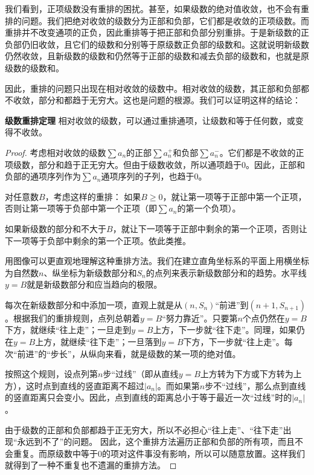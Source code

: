 \documentclass[12pt,UTF8,fontset=none]{ctexbook}
\begin{document}
我们看到，正项级数没有重排的困扰。甚至，如果级数的绝对值收敛，也不会有重排的问题。我们把绝对收敛的级数分为正部和负部，它们都是收敛的正项级数。而重排并不改变通项的正负，因此重排等于把正部和负部分别重排。于是新级数的正负部仍旧收敛，且它们的级数和分别等于原级数正负部的级数和。这就说明新级数仍然收敛，且新级数的级数和仍然等于正部的级数和减去负部的级数和，也就是原级数的级数和。

因此，重排的问题只出现在相对收敛的级数中。相对收敛的级数，其正部和负部都不收敛，部分和都趋于无穷大。这也是问题的根源。我们可以证明这样的结论：
\begin{tm}{\textbf{级数重排定理}}
    相对收敛的级数，可以通过重排通项，让级数和等于任何数，或变得不收敛。
\end{tm}

\begin{proof}
    考虑相对收敛的级数$\sum a_n$的正部$\sum a_n^+$和负部$\sum a_n^-$。它们都是不收敛的正项级数，部分和趋于正无穷大。但由于级数收敛，所以通项趋于$0$。因此，正部和负部的通项序列作为$\sum a_n$通项序列的子列，也趋于$0$。

    对任意数$B$，考虑这样的重排：
    如果$B\geqslant 0$，就让第一项等于正部中第一个正项，否则让第一项等于负部中第一个正项（即$\sum a_n$的第一个负项）。

    如果新级数的部分和不大于$B$，就让下一项等于正部中剩余的第一个正项，否则让下一项等于负部中剩余的第一个正项。依此类推。

    用图像可以更直观地理解这种重排方法。我们在建立直角坐标系的平面上用横坐标为自然数$n$、纵坐标为新级数部分和$S_n$的点列来表示新级数部分和的趋势。水平线$y = B$就是新级数部分和应当趋向的极限。

    每次在新级数部分和中添加一项，直观上就是从$(n, S_n)$“前进”到$(n+1, S_{n+1})$。根据我们的重排规则，点列总朝着$y=B$“努力靠近”。只要第$n$个点仍然在$y = B$下方，就继续“往上走”；一旦走到$y = B$上方，下一步就“往下走”。同理，如果仍在$y = B$上方，就继续“往下走”；一旦落到$y = B$下方，下一步就“往上走”。每次“前进”的“步长”，从纵向来看，就是级数的某一项的绝对值。

    按照这个规则，设点列第$n$步“过线”（即从直线$y = B$上方转为下方或下方转为上方），这时点到直线的竖直距离不超过$|a_n|$。而如果第$n$步不“过线”，那么点到直线的竖直距离只会变小。因此，点到直线的距离总小于等于最近一次“过线”时的$|a_n|$。

    由于级数的正部和负部都趋于正无穷大，所以不必担心“往上走”、“往下走”出现“永远到不了”的问题。
    因此，这个重排方法遍历正部和负部的所有项，而且不会重复。而原级数中等于$0$的项对这件事没有影响，所以可以随意放置。这样我们就得到了一种不重复也不遗漏的重排方法。
    

\end{proof}
\end{document}
